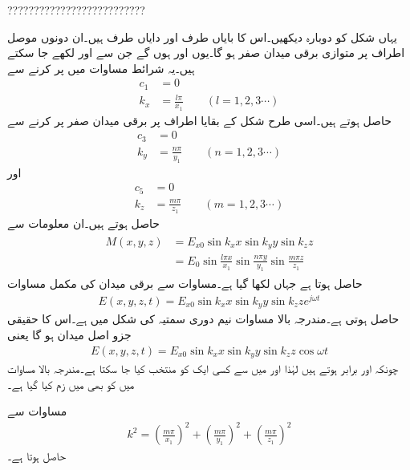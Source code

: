 
??????????????????????????


یہاں شکل  کو دوبارہ دیکھیں۔اس کا بایاں طرف  اور دایاں طرف  ہیں۔ان دونوں موصل اطراف پر متوازی برقی میدان صفر ہو گا۔یوں  اور  ہوں گے جن سے  اور  لکھے جا سکتے ہیں۔یہ شرائط مساوات  میں پر کرنے سے
\begin{align}
c_1&=0\\
k_x &=\frac{l \pi}{x_1} \quad \quad (l=1,2,3\cdots)
\end{align}
حاصل ہوتے ہیں۔اسی طرح شکل  کے بقایا اطراف پر برقی میدان صفر پر کرنے سے
\begin{align}
c_3&=0\\
k_y &=\frac{n \pi}{y_1} \quad \quad (n=1,2,3\cdots)
\end{align}
اور
\begin{align}
c_5&=0\\
k_z &=\frac{m \pi}{z_1} \quad \quad (m=1,2,3\cdots)
\end{align}
حاصل ہوتے ہیں۔ان معلومات سے
\begin{gather}
\begin{aligned}
M(x,y,z)&=E_{x0} \sin k_x x \sin k_y y \sin k_z z \\
&=E_0 \sin \frac{l \pi x}{x_1}\sin \frac{n\pi y}{y_1}\sin \frac{m \pi z}{z_1}
\end{aligned}
\end{gather}
حاصل ہوتا ہے جہاں  لکھا گیا ہے۔مساوات  سے برقی میدان کی مکمل مساوات
\begin{align}
E(x,y,z,t)=E_{x0} \sin k_x x \sin k_y y \sin k_z z e^{j \omega t}
\end{align}
حاصل ہوتی ہے۔مندرجہ بالا مساوات نیم دوری سمتیہ کی شکل میں ہے۔اس کا حقیقی جزو اصل میدان ہو گا یعنی
\begin{align}
E(x,y,z,t)=E_{x0} \sin k_x x \sin k_y y \sin k_z z \cos \omega t
\end{align}
چونکہ  اور  برابر ہوتے ہیں لہٰذا  اور  میں سے کسی ایک کو منتخب کیا جا سکتا ہے۔مندرجہ بالا مساوات میں  کو بھی  میں زم کیا گیا ہے۔

مساوات   سے
\begin{align}
k^2=\left(\frac{m \pi}{x_1}\right)^2+\left(\frac{m \pi}{y_1}\right)^2 +\left(\frac{m \pi}{z_1}\right)^2
\end{align}
حاصل ہوتا ہے۔
